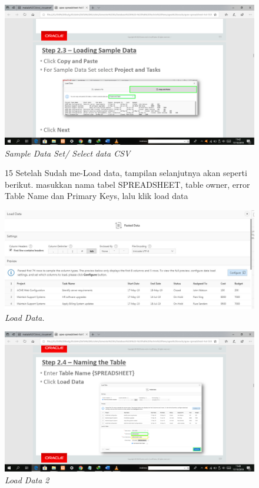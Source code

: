 \begin{enumerate}
\begin{figure}
    \begin{center}
\includegraphics[scale=0.2]{figures/pict(9).png}
    \caption{\textit{Sample Data Set/ Select data CSV}}
        \end{center}
\label{gambar}
\end{figure}

\begin{figure}
\item[15] Setelah Sudah me-Load data, tampilan selanjutnya akan seperti berikut. masukkan nama tabel {SPREADSHEET}, table owner, error Table Name dan Primary Keys, lalu klik load data

    \begin{center}
\includegraphics[scale=0.4]{figures/pict(10).jpg}
    \caption{\textit{Load Data.}}
        \end{center}
\label{gambar}
\end{figure}

\begin{figure}
    \begin{center}
\includegraphics[scale=0.2]{figures/pict(11).png}
    \caption{\textit{Load Data 2}}
        \end{center}
\label{gambar}
\end{figure}


\end{enumerate}
